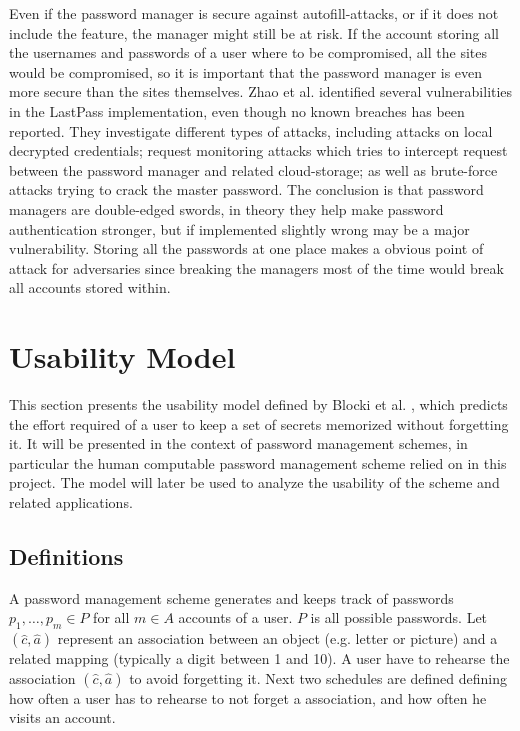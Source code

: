 \par Even if the password manager is secure against autofill-attacks, or if it does not include the feature, the manager might still be at risk. If the account storing all the usernames and passwords of a user where to be compromised, all the sites would be compromised, so it is important that the password manager is even more secure than the sites themselves. Zhao et al. \cite{lastpass-security} identified several vulnerabilities in the LastPass implementation, even though no known breaches has been reported. They investigate different types of attacks, including attacks on local decrypted credentials; request monitoring attacks which tries to intercept request between the password manager and related cloud-storage; as well as brute-force attacks trying to crack the master password. The conclusion is that password managers are double-edged swords, in theory they help make password authentication stronger, but if implemented slightly wrong may be a major vulnerability. Storing all the passwords at one place makes a obvious point of attack for adversaries since breaking the managers most of the time would break all accounts stored within.



\section{Usability Model}\label{sec:usability-model}
This section presents the usability model defined by Blocki et al. \cite{naturally-rehearsing}, which predicts the effort required of a user to keep a set of secrets memorized without forgetting it. It will be presented in the context of password management schemes, in particular the human computable password management scheme relied on in this project. The model will later be used to analyze the usability of the scheme and related applications.

\subsection{Definitions}
A password management scheme generates and keeps track of passwords $p_1, \dots, p_m \in P$ for all $m \in A$ accounts of a user. $P$ is all possible passwords. Let $(\hat c, \hat a)$ represent an association between an object (e.g. letter or picture) and a related  mapping (typically a digit between 1 and 10). A user have to rehearse the association $(\hat c, \hat a)$ to avoid forgetting it. Next two schedules are defined defining how often a user has to rehearse to not forget a association, and how often he visits an account.

